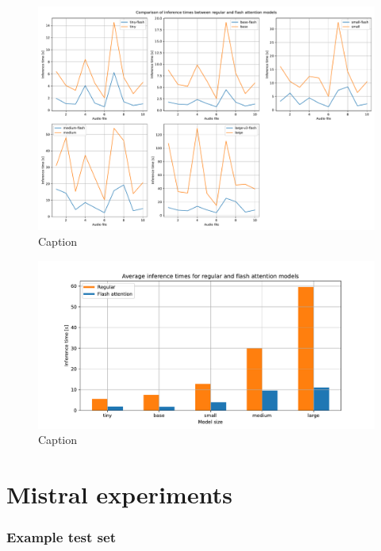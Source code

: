 \begin{figure}
    \centering
    \includegraphics[width=\textwidth]{figures/inf_time.pdf}
    \caption{Caption}
    \label{fig:whisper_inf_time}
\end{figure}

\begin{figure}
    \centering
    \includegraphics[width=\textwidth]{figures/avg_inf_time.pdf}
    \caption{Caption}
    \label{fig:whisper_avg_inf_time}
\end{figure}

\section{Mistral experiments}

\subsubsection{Example test set}

